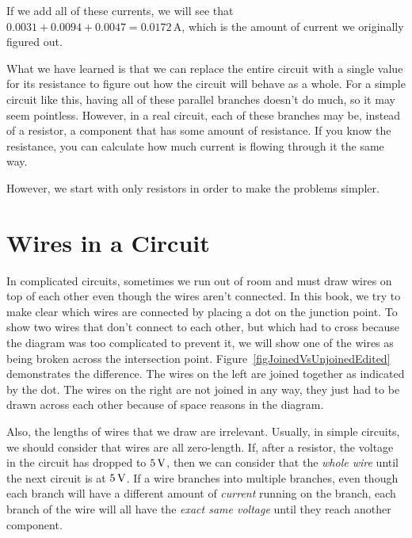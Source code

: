 If we add all of these currents, we will see that $0.0031 + 0.0094 + 0.0047 = 0.0172\,\si{\ampere}$, which is the amount of current we originally figured out.

What we have learned is that we can replace the entire circuit with a single value for its resistance to figure out how the circuit will behave as a whole.
For a simple circuit like this, having all of these parallel branches doesn't do much, so it may seem pointless.
However, in a real circuit, each of these branches may be, instead of a resistor, a component that has some amount of resistance.
If you know the resistance, you can calculate how much current is flowing through it the same way.

However, we start with only resistors in order to make the problems simpler.


\section{Wires in a Circuit}

In complicated circuits, sometimes we run out of room and must draw wires on top of each other even though the wires aren't connected.
In this book, we try to make clear which wires are connected by placing a dot on the junction point.
To show two wires that don't connect to each other, but which had to cross because the diagram was too complicated to prevent it, we will show one of the wires as being broken across the intersection point.
Figure~\ref{figJoinedVsUnjoinedEdited} demonstrates the difference.
The wires on the left are joined together as indicated by the dot.
The wires on the right are not joined in any way, they just had to be drawn across each other because of space reasons in the diagram.


Also, the lengths of wires that we draw are irrelevant.  
Usually, in simple circuits, we should consider that wires are all zero-length.
If, after a resistor, the voltage in the circuit has dropped to $5\,\si{\volt}$, then we can consider that the \emph{whole wire} until the next circuit is at $5\,\si{\volt}$.  
If a wire branches into multiple branches, even though each branch will have a different amount of \emph{current} running on the branch, each branch of the wire will all have the \emph{exact same voltage} until they reach another component.

